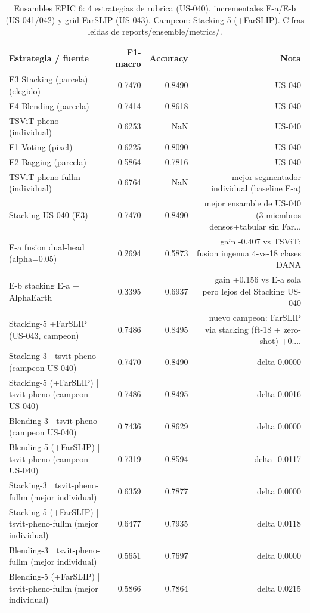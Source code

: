 \begin{table}
\caption{Ensambles EPIC 6: 4 estrategias de rubrica (US-040), incrementales E-a/E-b (US-041/042) y grid FarSLIP (US-043). Campeon: Stacking-5 (+FarSLIP). Cifras leidas de reports/ensemble/metrics/.}
\label{tab:ensembles_e6}
\begin{tabular}{lrrr}
\toprule
Estrategia / fuente & F1-macro & Accuracy & Nota \\
\midrule
E3 Stacking (parcela) (elegido) & 0.7470 & 0.8490 & US-040 \\
E4 Blending (parcela) & 0.7414 & 0.8618 & US-040 \\
TSViT-pheno (individual) & 0.6253 & NaN & US-040 \\
E1 Voting (pixel) & 0.6225 & 0.8090 & US-040 \\
E2 Bagging (parcela) & 0.5864 & 0.7816 & US-040 \\
TSViT-pheno-fullm (individual) & 0.6764 & NaN & mejor segmentador individual (baseline E-a) \\
Stacking US-040 (E3) & 0.7470 & 0.8490 & mejor ensamble de US-040 (3 miembros densos+tabular sin Far... \\
E-a fusion dual-head (alpha=0.05) & 0.2694 & 0.5873 & gain -0.407 vs TSViT: fusion ingenua 4-vs-18 clases DANA \\
E-b stacking E-a + AlphaEarth & 0.3395 & 0.6937 & gain +0.156 vs E-a sola pero lejos del Stacking US-040 \\
Stacking-5 +FarSLIP (US-043, campeon) & 0.7486 & 0.8495 & nuevo campeon: FarSLIP via stacking (ft-18 + zero-shot) +0.... \\
Stacking-3 | tsvit-pheno (campeon US-040) & 0.7470 & 0.8490 & delta 0.0000 \\
Stacking-5 (+FarSLIP) | tsvit-pheno (campeon US-040) & 0.7486 & 0.8495 & delta 0.0016 \\
Blending-3 | tsvit-pheno (campeon US-040) & 0.7436 & 0.8629 & delta 0.0000 \\
Blending-5 (+FarSLIP) | tsvit-pheno (campeon US-040) & 0.7319 & 0.8594 & delta -0.0117 \\
Stacking-3 | tsvit-pheno-fullm (mejor individual) & 0.6359 & 0.7877 & delta 0.0000 \\
Stacking-5 (+FarSLIP) | tsvit-pheno-fullm (mejor individual) & 0.6477 & 0.7935 & delta 0.0118 \\
Blending-3 | tsvit-pheno-fullm (mejor individual) & 0.5651 & 0.7697 & delta 0.0000 \\
Blending-5 (+FarSLIP) | tsvit-pheno-fullm (mejor individual) & 0.5866 & 0.7864 & delta 0.0215 \\
\bottomrule
\end{tabular}
\end{table}
